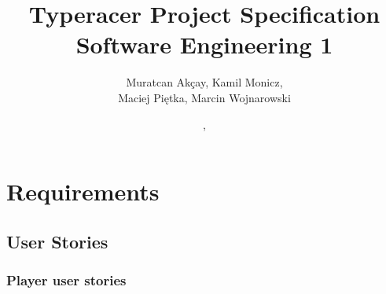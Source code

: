 \documentclass{article}
\title{Typeracer Project Specification \\ \large Software Engineering 1}
\author{Muratcan Akçay, Kamil Monicz,\\ Maciej Piętka, Marcin Wojnarowski}
\date{\monthname, \the\year}
\begin{document}
\maketitle

\tableofcontents

\section{Requirements}

\subsection{User Stories}

\subsubsection{Player user stories}

\newcommand{\AC}{\subitem AC. }
\end{document}
